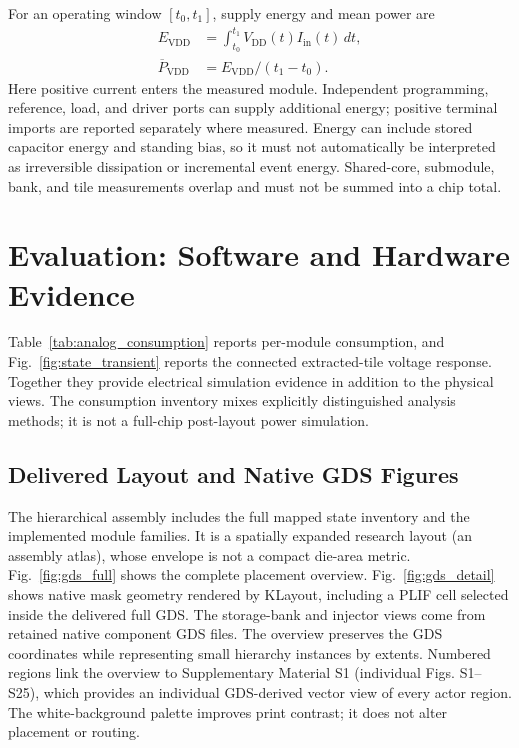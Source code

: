 \documentclass[preprint,12pt,number]{elsarticle}
\begin{document}
For an operating window $[t_0,t_1]$, supply energy and mean power are
\begin{align}
 E_{\mathrm{VDD}}&=\int_{t_0}^{t_1}V_{\mathrm{DD}}(t)I_{\mathrm{in}}(t)\,dt,\\
 \overline P_{\mathrm{VDD}}&=E_{\mathrm{VDD}}/(t_1-t_0).
\end{align}
Here positive current enters the measured module. Independent programming, reference, load, and driver ports can supply additional energy; positive terminal imports are reported separately where measured. Energy can include stored capacitor energy and standing bias, so it must not automatically be interpreted as irreversible dissipation or incremental event energy. Shared-core, submodule, bank, and tile measurements overlap and must not be summed into a chip total.

\section{Evaluation: Software and Hardware Evidence}
\label{sec:results}
Table~\ref{tab:analog_consumption} reports per-module consumption, and Fig.~\ref{fig:state_transient} reports the connected extracted-tile voltage response. Together they provide electrical simulation evidence in addition to the physical views. The consumption inventory mixes explicitly distinguished analysis methods; it is not a full-chip post-layout power simulation.

\subsection{Delivered Layout and Native GDS Figures}
The hierarchical assembly includes the full mapped state inventory and the implemented module families. It is a spatially expanded research layout (an assembly atlas), whose envelope is not a compact die-area metric. Fig.~\ref{fig:gds_full} shows the complete placement overview. Fig.~\ref{fig:gds_detail} shows native mask geometry rendered by KLayout, including a PLIF cell selected inside the delivered full GDS. The storage-bank and injector views come from retained native component GDS files. The overview preserves the GDS coordinates while representing small hierarchy instances by extents. Numbered regions link the overview to Supplementary Material S1 (individual Figs. S1--S25), which provides an individual GDS-derived vector view of every actor region. The white-background palette improves print contrast; it does not alter placement or routing.
\end{document}
